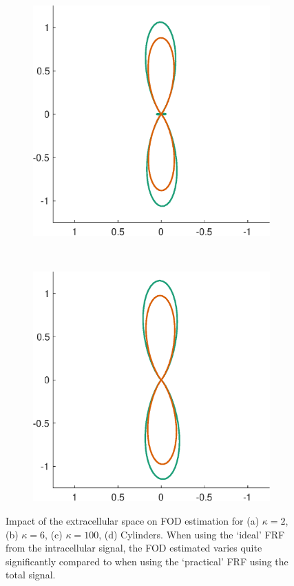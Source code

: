 \begin{figure}
  \begin{subfigure}[]{0.4\textwidth}
    \includegraphics[width=\textwidth]{figures/frf_experiment/fod_inex_b3000_kappa100}
    \caption{}
  \end{subfigure}
  ~
  \begin{subfigure}[]{0.4\textwidth}
    \includegraphics[width=\textwidth]{figures/frf_experiment/fod_inex_b3000_GamCyl}
    \caption{}
  \end{subfigure}

  \caption[Impact of the extracellular space on FOD estimate]{Impact of the extracellular space on FOD estimation for (a) $\kappa=2$, (b) $\kappa=6$, (c) $\kappa=100$, (d) Cylinders. When using the `ideal' \ac{FRF} from the intracellular signal, the \ac{FOD} estimated varies quite significantly compared to when using the `practical' \ac{FRF} using the total signal.}
  \label{fig:frf_intra_ex_fod}
\end{figure}

